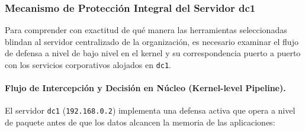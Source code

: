 \subsubsection{Mecanismo de Protección Integral del Servidor dc1}

Para comprender con exactitud de qué manera las herramientas seleccionadas blindan al servidor centralizado de la organización, es necesario examinar el flujo de defensa a nivel de bajo nivel en el kernel y su correspondencia puerto a puerto con los servicios corporativos alojados en \texttt{dc1}.

\paragraph{Flujo de Intercepción y Decisión en Núcleo (Kernel-level Pipeline).}
El servidor \texttt{dc1} (\texttt{192.168.0.2}) implementa una defensa activa que opera a nivel de paquete antes de que los datos alcancen la memoria de las aplicaciones:

